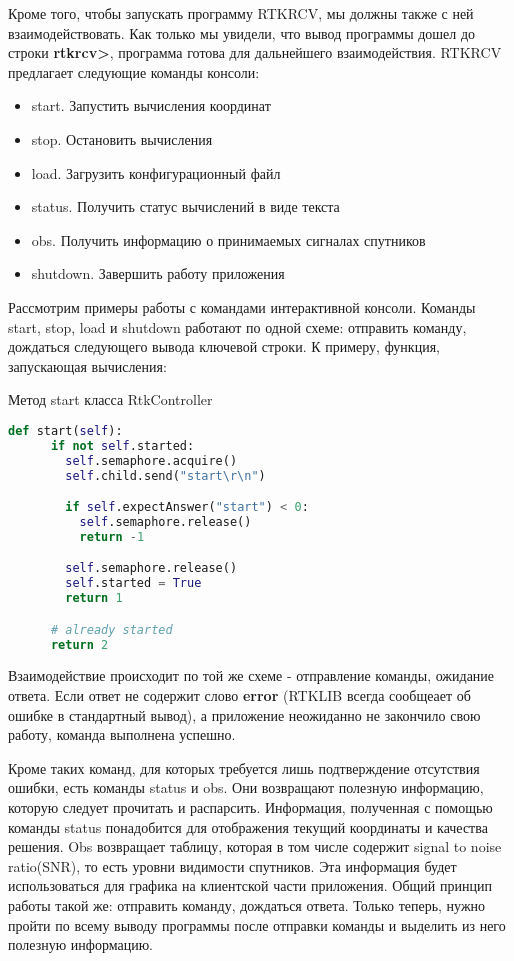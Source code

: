 Кроме того, чтобы запускать программу RTKRCV, мы должны также с ней взаимодействовать. Как только мы увидели, что вывод программы дошел до строки \textbf{rtkrcv>}, программа готова для дальнейшего взаимодействия. RTKRCV предлагает следующие команды консоли:

\begin{itemize}
  \item start. Запустить вычисления координат
  \item stop. Остановить вычисления
  \item load. Загрузить конфигурационный файл
  \item status. Получить статус вычислений в виде текста
  \item obs. Получить информацию о принимаемых сигналах спутников
  \item shutdown. Завершить работу приложения
\end{itemize}

Рассмотрим примеры работы с командами интерактивной консоли. Команды start, stop, load и shutdown работают по одной схеме: отправить команду, дождаться следующего вывода ключевой строки. К примеру, функция, запускающая вычисления:

\begin{ListingEnv}[H]
  \caption{Метод start класса RtkController}
  \label{list:hwbeauty}
  \begin{lstlisting}[language=Python]
    def start(self):
      if not self.started:
        self.semaphore.acquire()
        self.child.send("start\r\n")

        if self.expectAnswer("start") < 0:
          self.semaphore.release()
          return -1

        self.semaphore.release()
        self.started = True
        return 1

      # already started
      return 2
  \end{lstlisting}
\end{ListingEnv}

Взаимодействие происходит по той же схеме - отправление команды, ожидание ответа. Если ответ не содержит слово \textbf{error} (RTKLIB всегда сообщеает об ошибке в стандартный вывод), а приложение неожиданно не закончило свою работу, команда выполнена успешно.

Кроме таких команд, для которых требуется лишь подтверждение отсутствия ошибки, есть команды status и obs. Они возвращают полезную информацию, которую следует прочитать и распарсить. Информация, полученная с помощью команды status понадобится для отображения текущий координаты и качества решения. Obs возвращает таблицу, которая в том числе содержит signal to noise ratio(SNR), то есть уровни видимости спутников. Эта информация будет использоваться для графика на клиентской части приложения. Общий принцип работы такой же: отправить команду, дождаться ответа. Только теперь, нужно пройти по всему выводу программы после отправки команды и выделить из него полезную информацию.


